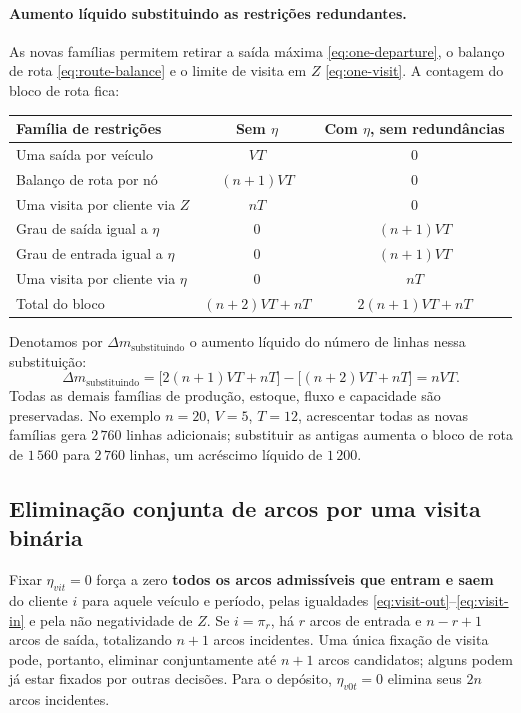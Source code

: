 \documentclass[11pt,a4paper]{article}
\begin{document}
\paragraph{Aumento líquido substituindo as restrições redundantes.} As novas famílias permitem retirar a saída máxima \eqref{eq:one-departure}, o balanço de rota \eqref{eq:route-balance} e o limite de visita em $Z$ \eqref{eq:one-visit}. A contagem do bloco de rota fica:
\begin{center}
\begin{tabular}{lcc}
\toprule
Família de restrições & Sem $\eta$ & Com $\eta$, sem redundâncias \\
\midrule
Uma saída por veículo & $VT$ & $0$ \\
Balanço de rota por nó & $(n+1)VT$ & $0$ \\
Uma visita por cliente via $Z$ & $nT$ & $0$ \\
Grau de saída igual a $\eta$ & $0$ & $(n+1)VT$ \\
Grau de entrada igual a $\eta$ & $0$ & $(n+1)VT$ \\
Uma visita por cliente via $\eta$ & $0$ & $nT$ \\
\midrule
Total do bloco & $(n+2)VT+nT$ & $2(n+1)VT+nT$ \\
\bottomrule
\end{tabular}
\end{center}
Denotamos por $\Delta m_{\mathrm{substituindo}}$ o aumento líquido do número de linhas nessa substituição:
\[
 \Delta m_{\mathrm{substituindo}}
 =\bigl[2(n+1)VT+nT\bigr]-\bigl[(n+2)VT+nT\bigr]
 =nVT.
\]
Todas as demais famílias de produção, estoque, fluxo e capacidade são preservadas. No exemplo $n=20$, $V=5$, $T=12$, acrescentar todas as novas famílias gera $2\,760$ linhas adicionais; substituir as antigas aumenta o bloco de rota de $1\,560$ para $2\,760$ linhas, um acréscimo líquido de $1\,200$.

\subsection{Eliminação conjunta de arcos por uma visita binária}

Fixar $\eta_{vit}=0$ força a zero \textbf{todos os arcos admissíveis que entram e saem} do cliente $i$ para aquele veículo e período, pelas igualdades \eqref{eq:visit-out}--\eqref{eq:visit-in} e pela não negatividade de $Z$. Se $i=\pi_r$, há $r$ arcos de entrada e $n-r+1$ arcos de saída, totalizando $n+1$ arcos incidentes. Uma única fixação de visita pode, portanto, eliminar conjuntamente até $n+1$ arcos candidatos; alguns podem já estar fixados por outras decisões. Para o depósito, $\eta_{v0t}=0$ elimina seus $2n$ arcos incidentes.
\end{document}
